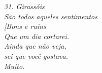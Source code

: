 \clearpage
\thispagestyle{empty}

\vspace*{\fill}

\begin{flushright}
    \itshape
    31. Girassóis \\[0.5cm]

    São todos aqueles sentimentos \\
    {[}Bons e ruins \\
    Que um dia cortarei. \\[\baselineskip]
    Ainda que não veja,\\
    sei que você gostava.\\
    Muito.\\
\end{flushright}

\clearpage
